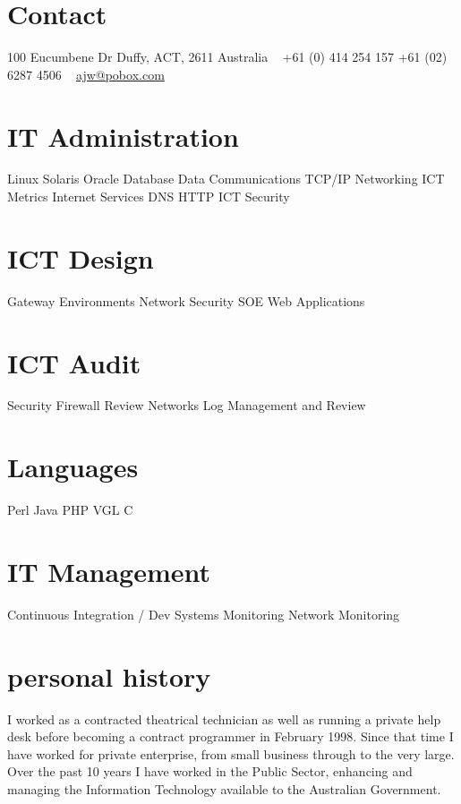 \documentclass[]{friggeri-cv} %
\begin{document}


\begin{aside} %
\section{Contact}
100 Eucumbene Dr
Duffy, ACT, 2611
Australia
~
+61 (0) 414 254 157
+61 (02) 6287 4506
~
\href{mailto:ajw@pobox.com}{ajw@pobox.com}
\section{IT Administration}
Linux
Solaris
Oracle Database
Data Communications
TCP/IP Networking
ICT Metrics
Internet Services
DNS
HTTP
ICT Security
\section{ICT Design}
Gateway Environments
Network
Security
SOE
Web Applications
\section{ICT Audit}
Security
Firewall Review
Networks
Log Management and Review
\section{Languages}
Perl
Java
PHP
VGL
C
\section{IT Management}
Continuous Integration / Dev
Systems Monitoring
Network Monitoring
\end{aside}

\section{personal history}
I worked as a contracted theatrical technician as well as running a private help desk before becoming a contract programmer in February 1998. Since that time I have worked for private enterprise, from small business through to the very large. Over the past 10 years I have worked in the Public Sector, enhancing and managing the Information Technology available to the Australian Government.
\end{document}
